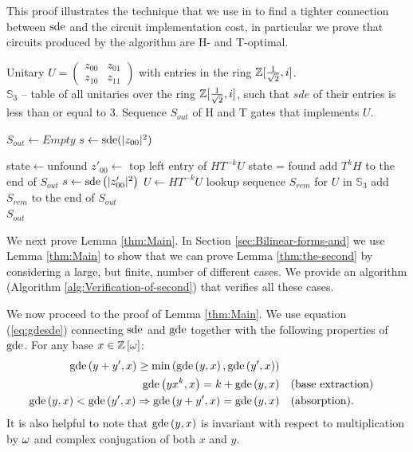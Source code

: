 \documentclass[english,journal]{extarticle}
\theoremstyle{plain}
\theoremstyle{plain}
\theoremstyle{plain}
\theoremstyle{definition}
\theoremstyle{plain}
\theoremstyle{plain}
\begin{document}
This proof illustrates the technique that we use in  to
find a tighter connection between $\mathrm{sde}$ and the circuit implementation cost, in particular we prove that circuits produced by the algorithm are H- and T-optimal.

\begin{algorithm}[H]
\begin{algorithmic}
\Require  Unitary $U=\left(\begin{array}{cc}
z_{00} & z_{01}\\
z_{10} & z_{11}
\end{array}\right)$ with entries in the ring $\R$. \\
$\mathbb{S}_3$ -- table of all unitaries over the ring $\R$,
such that $sde$ of their entries is less than or equal to 3.
\Ensure Sequence $S_{out}$ of H and T gates that implements $U$.

\State $S_{out}\leftarrow Empty$
\State $s\leftarrow \mathrm{sde}(|z_{00}|^{2})$

\State state$\leftarrow$unfound
	\State $z'_{00}\leftarrow$ top left entry of $HT^{-k}U$
			\State state = found 
			\State add $T^{k}H$ to the end of $S_{out}$
			\State $s\leftarrow \mathrm{sde}\left(|z_{00}'|^{2}\right)$
			\State $U\leftarrow HT^{-k}U$
		\EndIf
	\EndWhile
\EndFor
\EndWhile
\State lookup sequence $S_{rem}$ for $U$ in $\mathbb{S}_3$
\State add $S_{rem}$ to the end of $S_{out}$ \\
\Return $S_{out}$
\end{algorithmic} 

\caption{\label{alg:Decomposition-of-unitary}Decomposition of a unitary matrix
with entries in the ring $\R$.}
\end{algorithm}


We next prove Lemma \ref{thm:Main}.  In Section \ref{sec:Bilinear-forms-and}
we use Lemma \ref{thm:Main} to show that we can prove Lemma \ref{thm:the-second}
by considering a large, but finite, number of different cases. We
provide an algorithm (Algorithm \ref{alg:Verification-of-second}) that verifies all these cases.

We now proceed to the proof of Lemma \ref{thm:Main}. We use equation
(\ref{eq:gdesde}) connecting $\mathrm{sde}$ and $\mathbf{\mathrm{gde}}$ together with the following 
properties of $\mathbf{\mathrm{gde}}$. For any base $x\in\mathbb{Z}\left[\omega\right]$: 
\begin{align}
\mathbf{\mathrm{gde}}\left(y+y',x\right)\ge\min\left(\mathbf{\mathrm{gde}}\left(y,x\right),\mathbf{\mathrm{gde}}\left(y',
x\right)\right)\quad\label{eq:splitting}\\
\mathbf{\mathrm{gde}}\left(yx^{k},x\right)=k+\mathbf{\mathrm{gde}}\left(y,x\right)\quad & \mbox{(base
extraction)}\label{eq:base-extr}\\
\mathbf{\mathrm{gde}}\left(y,x\right)<\mathbf{\mathrm{gde}}\left(y',x\right)\Rightarrow\mathbf{\mathrm{gde}}\left(y+y',
x\right)=\mathbf{\mathrm{gde}}\left(y,x\right)\quad & \mbox{(absorption)}\label{eq:absorption}.
\end{align}
It is also helpful to note that $\mathbf{\mathrm{gde}}\left(y,x\right)$ is invariant
with respect to multiplication by $\omega$ and complex conjugation of
both $x$ and $y$. 
\end{document}
